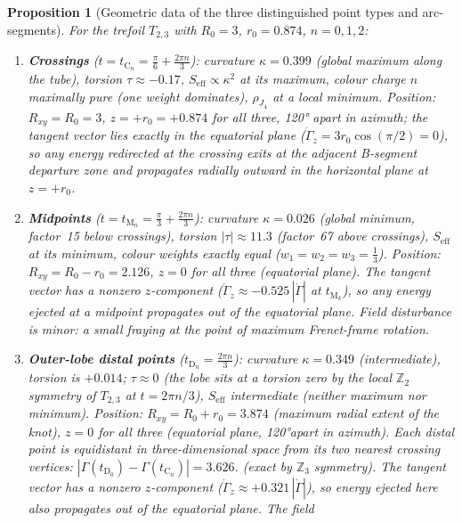 \documentclass[11pt,a4paper]{article}
\newtheorem{proposition}[theorem]{Proposition}
\theoremstyle{definition}\newtheorem{definition}[theorem]{Definition}
\theoremstyle{remark}
\theoremstyle{definition}\newtheorem{construction}[theorem]{Construction}
\begin{document}
\begin{proposition}[Geometric data of the three distinguished point types and
arc-segments]
\label{P16:prop:geom_data}
For the trefoil $T_{2,3}$ with $R_0=3$, $r_0=0.874$, $n=0,1,2$:
\begin{enumerate}[label=(\roman*)]
\item \textbf{Crossings} 
($t=t_{\mathrm{C}_n} = \tfrac{\pi}{6}+\tfrac{2\pi n}{3}$):
  curvature $\kappa=0.399$ (global maximum along the tube), torsion
  $\tau\approx-0.17$, $S_{\mathrm{eff}}\propto\kappa^2$ at its maximum,
  colour charge $n$ maximally pure (one weight dominates), $\rho_{J_4}$ at
  a local minimum.  Position: $R_{xy}=R_0=3$, $z=+r_0=+0.874$ for all
  three, 120° apart in azimuth; the tangent vector lies \emph{exactly} in the
  equatorial plane ($\dot\Gamma_z=3r_0\cos(\pi/2)=0$), so any energy
  redirected at the crossing exits at the adjacent B-segment departure
  zone and propagates radially outward in the horizontal plane at
  $z=+r_0$.
\item \textbf{Midpoints} ($t=t_{\mathrm{M}_n}=\tfrac{\pi}{3}+\tfrac{2\pi n}{3}$):
  curvature $\kappa=0.026$ (global minimum, factor~15 below crossings),
  torsion $|\tau|\approx11.3$ (factor~67 above crossings), $S_{\mathrm{eff}}$
  at its minimum, colour weights exactly equal ($w_1=w_2=w_3=\tfrac{1}{3}$).
  Position: $R_{xy}=R_0-r_0=2.126$, $z=0$ for all three (equatorial plane).
  The tangent vector has a nonzero $z$-component
  ($\dot\Gamma_z\approx -0.525\,|\dot\Gamma|$ at $t_{\mathrm{M}_k}$),
  so any energy ejected at a midpoint propagates out of the equatorial plane.
  Field disturbance is minor: a small fraying at the point of maximum
  Frenet-frame rotation.
\item \textbf{Outer-lobe distal points} ($t_{\mathrm{D}_n}=\tfrac{2\pi n}{3}$):
  curvature $\kappa=0.349$ (intermediate), torsion is $+0.014$; $\tau\approx0$
  (the lobe sits at a torsion zero by the local $\mathbb{Z}_2$
  symmetry of $T_{2,3}$ at $t=2\pi n/3$),
  $S_{\mathrm{eff}}$ intermediate (neither maximum nor minimum).
  Position: $R_{xy}=R_0+r_0=3.874$ (maximum radial extent of the knot),
  $z=0$ for all three (equatorial plane, 120°apart in azimuth).
  Each distal point is equidistant in three-dimensional space from its
  two nearest crossing vertices:
  $|\Gamma(t_{\mathrm{D}_0})-\Gamma(t_{\mathrm{C}_n})|=3.626$.
  (exact by $\mathbb{Z}_3$ symmetry). The tangent vector has a nonzero
  $z$-component ($\dot\Gamma_z\approx +0.321\,|\dot\Gamma|$), so energy
  ejected here also propagates out of the equatorial plane.  The field

\end{enumerate}
\end{proposition}
\end{document}

